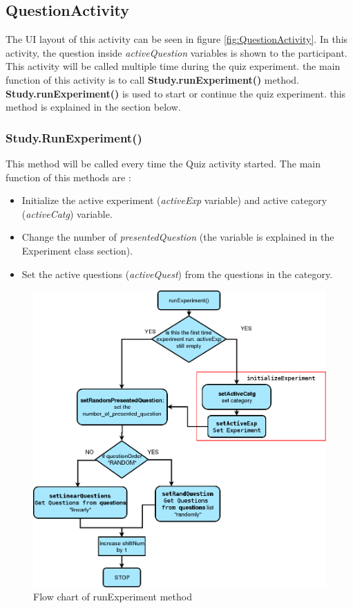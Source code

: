 \subsection{QuestionActivity}
The UI layout of this activity can be seen in figure \ref{fig:QuestionActivity}.
In this activity, the question inside \textit{activeQuestion} variables is shown to the participant.
This activity will be called multiple time during the quiz experiment.
the main function of this activity is to call \textbf{Study.runExperiment()} method.
\textbf{Study.runExperiment()} is used to start or continue the quiz experiment.
this method is explained in the section below.

\subsubsection{Study.RunExperiment()}
This method will be called every time the Quiz activity started.
The main function of this methods are :
\begin{itemize}
\item Initialize the active experiment (\textit{activeExp} variable) and active category (\textit{activeCatg}) variable.
\item Change the number of \textit{presentedQuestion} (the variable is explained in the Experiment class section).
\item Set the active questions (\textit{activeQuest}) from the questions in the category.
\end{itemize}


\begin{figure}
\begin{center}
\includegraphics[scale=0.45]{runExperiment}
\end{center}
\caption{Flow chart of runExperiment method}
\label{fig:runExperiment_flow}
\end{figure}


